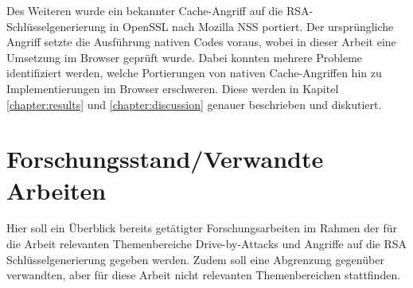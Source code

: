 Des Weiteren wurde ein bekannter Cache-Angriff auf die RSA-Schlüsselgenerierung in OpenSSL nach Mozilla NSS portiert.
Der ursprüngliche Angriff setzte die Ausführung nativen Codes voraus, wobei in dieser Arbeit eine Umsetzung im Browser geprüft wurde.
Dabei konnten mehrere Probleme identifiziert werden, welche Portierungen von nativen Cache-Angriffen hin zu Implementierungen im Browser erschweren. 
Diese werden in Kapitel \ref{chapter:results} und \ref{chapter:discussion} genauer beschrieben und diskutiert.

\section{Forschungsstand/Verwandte Arbeiten}
\label{related_work}

Hier soll ein Überblick bereits getätigter Forschungsarbeiten im Rahmen der für die Arbeit relevanten Themenbereiche %
Drive-by-Attacks 
und Angriffe auf die RSA Schlüsselgenerierung gegeben werden. Zudem soll eine Abgrenzung gegenüber verwandten, aber für diese Arbeit nicht relevanten Themenbereichen stattfinden.



